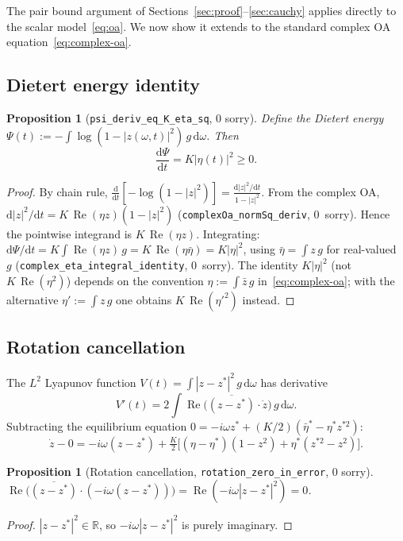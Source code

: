 \documentclass[11pt,a4paper]{article}
\newtheorem{proposition}[theorem]{Proposition}
\theoremstyle{definition}
\DeclareMathOperator{\re}{Re}
\newcommand{\R}{\mathbb{R}}
\begin{document}
The pair bound argument of Sections~\ref{sec:proof}--\ref{sec:cauchy} applies directly to the scalar model~\eqref{eq:oa}. We now show it extends to the standard complex OA equation~\eqref{eq:complex-oa}.

\subsection{Dietert energy identity}

\begin{proposition}[\texttt{psi\_deriv\_eq\_K\_eta\_sq}, 0 sorry]\label{prop:psi}
Define the Dietert energy $\Psi(t) := -\int \log(1-|z(\omega,t)|^2)\,g\,\mathrm{d}\omega$. Then
\[
\frac{\mathrm{d}\Psi}{\mathrm{d}t} = K|\eta(t)|^2 \geq 0.
\]
\end{proposition}
\begin{proof}
By chain rule, $\frac{\mathrm{d}}{\mathrm{d}t}[-\log(1-|z|^2)] = \frac{\mathrm{d}|z|^2/\mathrm{d}t}{1-|z|^2}$. From the complex OA, $\mathrm{d}|z|^2/\mathrm{d}t = K\,\re(\eta z)(1-|z|^2)$ (\texttt{complexOa\_normSq\_deriv}, 0~sorry). Hence the pointwise integrand is $K\,\re(\eta z)$. Integrating: $\mathrm{d}\Psi/\mathrm{d}t = K\int \re(\eta z)\,g = K\,\re(\eta\bar\eta) = K|\eta|^2$, using $\bar\eta = \int z\,g$ for real-valued~$g$ (\texttt{complex\_eta\_integral\_identity}, 0~sorry). The identity $K|\eta|^2$ (not $K\,\re(\eta^2)$) depends on the convention $\eta := \int \bar z\,g$ in~\eqref{eq:complex-oa}; with the alternative $\eta' := \int z\,g$ one obtains $K\,\re(\eta'^2)$ instead.
\end{proof}

\subsection{Rotation cancellation}

The $L^2$ Lyapunov function $V(t) = \int |z-z^*|^2\,g\,\mathrm{d}\omega$ has derivative
\[
V'(t) = 2\int \re\bigl(\overline{(z-z^*)}\cdot\dot z\bigr)\,g\,\mathrm{d}\omega.
\]
Subtracting the equilibrium equation $0 = -i\omega z^* + (K/2)(\bar\eta^* - \eta^* z^{*2})$:
\[
\dot z - 0 = -i\omega(z-z^*) + \tfrac{K}{2}\bigl[(\eta-\eta^*)(1-z^2) + \eta^*(z^{*2}-z^2)\bigr].
\]

\begin{proposition}[Rotation cancellation, \texttt{rotation\_zero\_in\_error}, 0 sorry]\label{prop:rotation}
$\re\bigl(\overline{(z-z^*)}\cdot(-i\omega(z-z^*))\bigr) = \re(-i\omega|z-z^*|^2) = 0$.
\end{proposition}
\begin{proof}
$|z-z^*|^2 \in \R$, so $-i\omega|z-z^*|^2$ is purely imaginary.
\end{proof}
\end{document}
